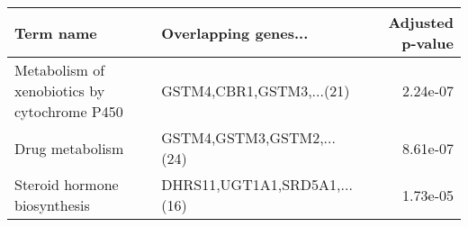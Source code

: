 \begin{tabular}{llr}
\toprule
                                   Term name &         Overlapping genes... &  Adjusted p-value \\
\midrule
Metabolism of xenobiotics by cytochrome P450 &     GSTM4,CBR1,GSTM3,...(21) &          2.24e-07 \\
                             Drug metabolism &    GSTM4,GSTM3,GSTM2,...(24) &          8.61e-07 \\
                Steroid hormone biosynthesis & DHRS11,UGT1A1,SRD5A1,...(16) &          1.73e-05 \\
\bottomrule
\end{tabular}

